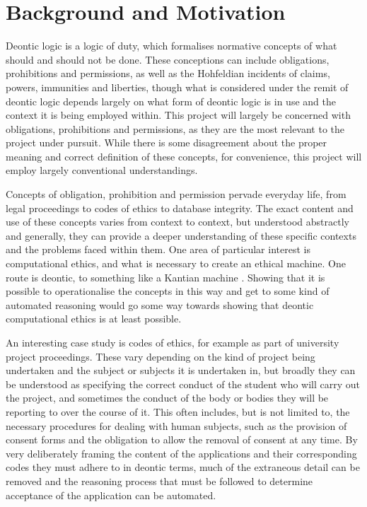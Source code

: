 \documentclass{l4proj}
\begin{document}
\section{Background and Motivation}
Deontic logic is a logic of duty, which formalises normative concepts of what should and should not be done. These conceptions can include obligations, prohibitions and permissions, as well as the Hohfeldian incidents \cite{Hohfeld} of claims, powers, immunities and liberties, though what is considered under the remit of deontic logic depends largely on what form of deontic logic is in use and the context it is being employed within. This project will largely be concerned with obligations, prohibitions and permissions, as they are the most relevant to the project under pursuit. While there is some disagreement about the proper meaning and correct definition of these concepts, for convenience, this project will employ largely conventional understandings. 

Concepts of obligation, prohibition and permission pervade everyday life, from legal proceedings to codes of ethics to database integrity. The exact content and use of these concepts varies from context to context, but understood abstractly and generally, they can provide a deeper understanding of these specific contexts and the problems faced within them. One area of particular interest is computational ethics, and what is necessary to create an ethical machine. One route is deontic, to something like a Kantian machine \cite{Powers}. Showing that it is possible to operationalise the concepts in this way and get to some kind of automated reasoning would go some way towards showing that deontic computational ethics is at least possible. 

An interesting case study is codes of ethics, for example as part of university project proceedings. These vary depending on the kind of project being undertaken and the subject or subjects it is undertaken in, but broadly they can be understood as specifying the correct conduct of the student who will carry out the project, and sometimes the conduct of the body or bodies they will be reporting to over the course of it. This often includes, but is not limited to, the necessary procedures for dealing with human subjects, such as the provision of consent forms and the obligation to allow the removal of consent at any time. By very deliberately framing the content of the applications and their corresponding codes they must adhere to in deontic terms, much of the extraneous detail can be removed and the reasoning process that must be followed to determine acceptance of the application can be automated.
\end{document}

